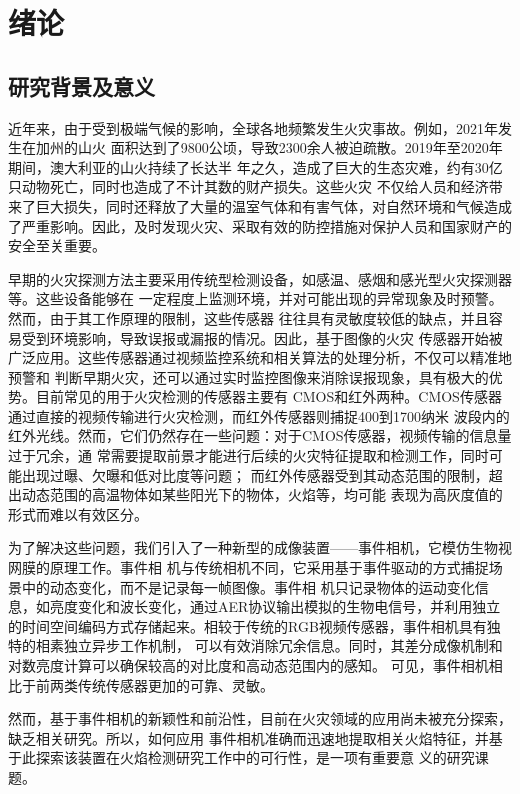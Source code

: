 
\chapter{绪论}

\section{研究背景及意义}

近年来，由于受到极端气候的影响，全球各地频繁发生火灾事故。例如，2021年发生在加州的山火
面积达到了9800公顷，导致2300余人被迫疏散。2019年至2020年期间，澳大利亚的山火持续了长达半
年之久，造成了巨大的生态灾难，约有30亿只动物死亡，同时也造成了不计其数的财产损失。这些火灾
不仅给人员和经济带来了巨大损失，同时还释放了大量的温室气体和有害气体，对自然环境和气候造成
了严重影响。因此，及时发现火灾、采取有效的防控措施对保护人员和国家财产的安全至关重要。

早期的火灾探测方法主要采用传统型检测设备，如感温、感烟和感光型火灾探测器等。这些设备能够在
一定程度上监测环境，并对可能出现的异常现象及时预警。然而，由于其工作原理的限制，这些传感器
往往具有灵敏度较低的缺点，并且容易受到环境影响，导致误报或漏报的情况。因此，基于图像的火灾
传感器开始被广泛应用。这些传感器通过视频监控系统和相关算法的处理分析，不仅可以精准地预警和
判断早期火灾，还可以通过实时监控图像来消除误报现象，具有极大的优势。目前常见的用于火灾检测的传感器主要有
CMOS和红外两种。CMOS传感器通过直接的视频传输进行火灾检测，而红外传感器则捕捉400到1700纳米
波段内的红外光线。然而，它们仍然存在一些问题：对于CMOS传感器，视频传输的信息量过于冗余，通
常需要提取前景才能进行后续的火灾特征提取和检测工作，同时可能出现过曝、欠曝和低对比度等问题；
而红外传感器受到其动态范围的限制，超出动态范围的高温物体如某些阳光下的物体，火焰等，均可能
表现为高灰度值的形式而难以有效区分。

为了解决这些问题，我们引入了一种新型的成像装置——事件相机，它模仿生物视网膜的原理工作\cite{gallego2020event,posch2014retinomorphic}。事件相
机与传统相机不同，它采用基于事件驱动的方式捕捉场景中的动态变化，而不是记录每一帧图像。事件相
机只记录物体的运动变化信息，如亮度变化和波长变化，通过AER协议\cite{rivas2005tools}输出模拟的生物电信号，并利用独立
的时间空间编码方式存储起来。相较于传统的RGB视频传感器，事件相机具有独特的相素独立异步工作机制，
可以有效消除冗余信息。同时，其差分成像机制和对数亮度计算可以确保较高的对比度和高动态范围内的感知。
可见，事件相机相比于前两类传统传感器更加的可靠、灵敏。

然而，基于事件相机的新颖性和前沿性，目前在火灾领域的应用尚未被充分探索，缺乏相关研究。所以，如何应用
事件相机准确而迅速地提取相关火焰特征，并基于此探索该装置在火焰检测研究工作中的可行性，是一项有重要意
义的研究课题。

